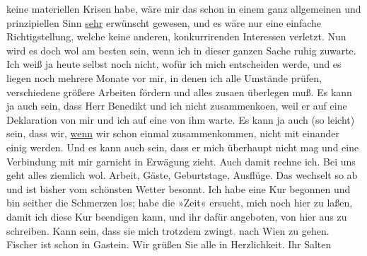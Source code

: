 \begin{ledgroupsized}[t]{13cm}
               keine materiellen Krisen habe, wäre mir das schon in einem ganz allgemeinen und
               prinzipiellen Sinn \uline{sehr} erwünscht gewesen, und es
               wäre nur eine einfache Richtigstellung, welche keine anderen, konkurrirenden
               Interessen verletzt. Nun wird es doch wol am besten sein, wenn ich in dieser ganzen
               Sache ruhig zuwarte. Ich weiß ja heute selbst {\pb}noch nicht, wofür ich mich
               entscheiden werde, und es liegen noch mehrere Monate vor mir, in denen ich alle
               Umstände prüfen, verschiedene größere Arbeiten fördern und alles zusa{\geminationm}en überlegen muß. Es kann ja auch sein, dass Herr Benedikt und ich nicht zusammenko{\geminationm}en, weil er auf eine Deklaration von mir und ich auf
               eine von ihm warte. Es kann ja auch (so leicht) sein, dass wir, \uline{wenn} wir schon einmal zusammenkommen, nicht mit einander einig werden.
               Und es kann auch sein, dass er mich überhaupt nicht mag und eine Verbindung mit mir
               garnicht in Erwägung zieht. Auch damit rechne ich.\pend
           \pstart
           Bei uns geht alles ziemlich
               wol. Arbeit, Gäste, Geburtstage, Ausflüge. Das wechselt so ab und ist bisher vom
               schönsten Wetter besonnt. Ich habe eine Kur begonnen und bin seither die Schmerzen
               los; habe die »Zeit« ersucht, mich noch hier zu laßen, damit ich diese
               Kur beendigen kann, und ihr dafür angeboten, von hier aus zu schreiben. Kann sein,
               dass sie mich trotzdem zwingt\textcolor{gray}{,} nach Wien zu gehen. Fischer ist schon in
                  Gastein. Wir grüßen Sie alle in
               Herzlichkeit.\pend
           \pstart Ihr \spacefill\mbox{Salten}\pend{}
         
         \endnumbering{}\end{ledgroupsized}  \newcommand{\dateiname}{L03553}\newcommand{\titel}{Felix Salten an Arthur Schnitzler, 16. 8. 1911}\newcommand{\editorInnen}{Martin Anton Müller und Laura Untner}
      